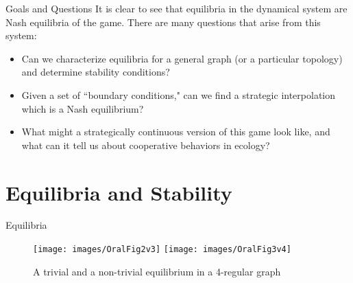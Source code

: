 \documentclass{beamer}
\begin{document}
\begin{frame}{Goals and Questions}
	It is clear to see that equilibria in the dynamical system are Nash equilibria of the game. There are many questions that arise from this system:
	\begin{itemize}
		\item Can we characterize equilibria for a general graph (or a particular topology) and determine stability conditions?
		
		\item Given a set of ``boundary conditions," can we find a strategic interpolation which is a Nash equilibrium?
		
		\item What might a strategically continuous version of this game look like, and what can it tell us about cooperative behaviors in ecology?
	\end{itemize}
\end{frame}
\section{Equilibria and Stability}
\begin{frame}{Equilibria}
	\begin{figure}
		\texttt{[image: images/OralFig2v3]}
		\texttt{[image: images/OralFig3v4]}
		\caption{A trivial and a non-trivial equilibrium in a 4-regular graph}
	\end{figure}
\end{frame}
\end{document}
